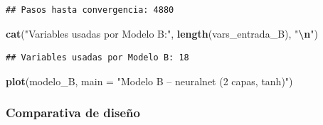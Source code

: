 \documentclass[
]{article}
\newenvironment{Shaded}{\begin{snugshade}}{\end{snugshade}}
\newcommand{\AttributeTok}[1]{\textcolor[rgb]{0.13,0.29,0.53}{#1}}
\newcommand{\DecValTok}[1]{\textcolor[rgb]{0.00,0.00,0.81}{#1}}
\newcommand{\FunctionTok}[1]{\textcolor[rgb]{0.13,0.29,0.53}{\textbf{#1}}}
\newcommand{\NormalTok}[1]{#1}
\newcommand{\SpecialCharTok}[1]{\textcolor[rgb]{0.81,0.36,0.00}{\textbf{#1}}}
\newcommand{\StringTok}[1]{\textcolor[rgb]{0.31,0.60,0.02}{#1}}
\begin{document}
\begin{Shaded}
\end{Shaded}

\begin{verbatim}
## Pasos hasta convergencia: 4880
\end{verbatim}

\begin{Shaded}
\begin{Highlighting}[]
\FunctionTok{cat}\NormalTok{(}\StringTok{"Variables usadas por Modelo B:"}\NormalTok{, }\FunctionTok{length}\NormalTok{(vars\_entrada\_B), }\StringTok{"}\SpecialCharTok{\textbackslash{}n}\StringTok{"}\NormalTok{)}
\end{Highlighting}
\end{Shaded}

\begin{verbatim}
## Variables usadas por Modelo B: 18
\end{verbatim}

\begin{Shaded}
\begin{Highlighting}[]
\FunctionTok{plot}\NormalTok{(modelo\_B, }\AttributeTok{main =} \StringTok{"Modelo B – neuralnet (2 capas, tanh)"}\NormalTok{)}
\end{Highlighting}
\end{Shaded}

\hypertarget{comparativa-de-diseuxf1o}{%
\subsubsection{Comparativa de diseño}\label{comparativa-de-diseuxf1o}}
\end{document}
